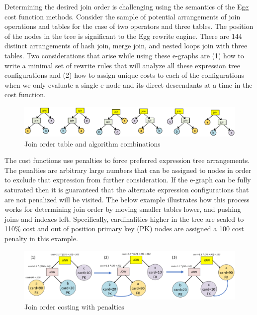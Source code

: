 \documentclass{article}
\begin{document}
Determining the desired join order is challenging using the semantics of the Egg cost function methods.  
Consider the sample of potential arrangements of join operations and tables for the
case of two operators and three tables.  The position of the nodes in the tree is significant to 
the Egg rewrite engine.  There are 144 distinct arrangements of hash join, merge join, and nested loops
join with three tables.  Two considerations that arise while using these e-graphs are (1) how to write 
a minimal set of rewrite rules that will analyze all these expression tree configurations and (2) 
how to assign unique costs to each of the configurations when we only evaluate a single e-node
and its direct descendants at a time in the cost function.

\begin{figure}[H]
\centering
\begin{minipage}[b]{1.0\textwidth}
    \includegraphics[width=\textwidth]{join_order.png}
    \caption{Join order table and algorithm combinations}
\end{minipage}
\hfill
\end{figure}

The cost functions use penalties to force preferred expression tree arrangements.  The penalties are arbitrary 
large numbers that can be assigned to nodes in order to exclude that expression from further consideration.
If the e-graph can be fully saturated then it is guaranteed that the alternate expression configurations that
are not penalized will be visited.  The below example illustrates how this process works for determining join 
order by moving smaller tables lower, and pushing joins and indexes left.  Specifically, cardinalities higher 
in the tree are scaled to 110\% cost and out of position primary key (PK) nodes are assigned a 100 cost 
penalty in this example.

\begin{figure}[H]
\centering
\begin{minipage}[b]{0.85\textwidth}
    \includegraphics[width=\textwidth]{join_cost.png}
    \caption{Join order costing with penalties}
\end{minipage}
\hfill
\end{figure}
\end{document}
